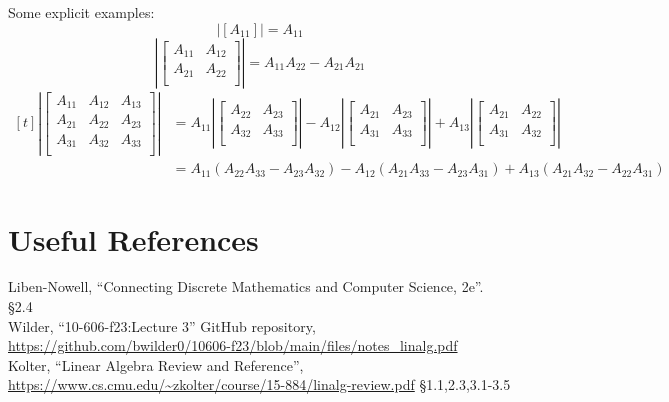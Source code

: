 Some explicit examples:
\[\left|\left[A_{11}\right]\right| = A_{11}\]
\[\left|\left[\begin{matrix}A_{11} & A_{12}\\ A_{21} & A_{22}\\\end{matrix}\right]\right| = A_{11}A_{22}-A_{21}A_{21}\]
\[
\begin{aligned}[t]
\left|\left[\begin{matrix}A_{11} & A_{12} & A_{13}\\ A_{21} & A_{22} & A_{23}\\ A_{31} & A_{32} & A_{33}\\\end{matrix}\right]\right| 
& = A_{11}\left|\left[\begin{matrix}A_{22} & A_{23}\\ A_{32} & A_{33}\\\end{matrix}\right]\right|-A_{12}\left|\left[\begin{matrix}A_{21} & A_{23}\\ A_{31} & A_{33}\\\end{matrix}\right]\right|+A_{13}\left|\left[\begin{matrix}A_{21} & A_{22}\\ A_{31} & A_{32}\\\end{matrix}\right]\right| \\
& = A_{11}\left(A_{22}A_{33}-A_{23}A_{32}\right)-A_{12}\left(A_{21}A_{33}-A_{23}A_{31}\right)+A_{13}\left(A_{21}A_{32}-A_{22}A_{31}\right) \end{aligned}\]


\section*{Useful References}
Liben-Nowell, ``Connecting Discrete Mathematics and Computer Science, 2e''. \S 2.4\\
Wilder, ``10-606-f23:Lecture 3'' GitHub repository, \url{https://github.com/bwilder0/10606-f23/blob/main/files/notes_linalg.pdf}\\
Kolter, ``Linear Algebra Review and Reference'', \url{https://www.cs.cmu.edu/~zkolter/course/15-884/linalg-review.pdf} \S1.1,2.3,3.1-3.5

